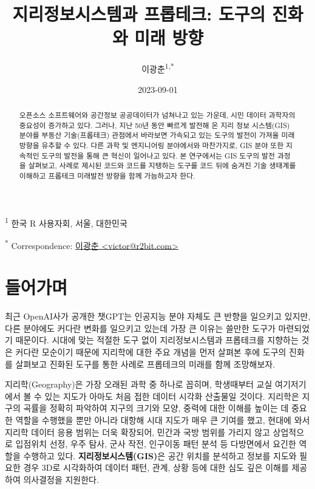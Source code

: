 \documentclass[
  a4paper,showtrims,openright,hidelinks]{oblivoir}
\title{지리정보시스템과 프롭테크: 도구의 진화와 미래 방향}
\author{이광춘\textsuperscript{1,*}}
\date{2023-09-01}
\begin{document}
\maketitle
\begin{abstract}
오픈소스 소프트웨어와 공간정보 공공데이터가 넘쳐나고 있는 가운데, 시민
데이터 과학자의 중요성이 증가하고 있다. 그러나, 지난 50년 동안 빠르게
발전해 온 지리 정보 시스템(GIS) 분야를 부동산 기술(프롭테크) 관점에서
바라보면 가속되고 있는 도구의 발전이 가져올 미래 방향을 유추할 수 있다.
다른 과학 및 엔지니어링 분야에서와 마찬가지로, GIS 분야 또한 지속적인
도구의 발전을 통해 큰 혁신이 일어나고 있다. 본 연구에서는 GIS 도구의
발전 과정을 살펴보고, 사례로 제시된 코드와 코드를 지탱하는 도구를 코드
뒤에 숨겨진 기술 생태계를 이해하고 프롭테크 미래발전 방향을 함께
가늠하고자 한다.
\end{abstract}
\textsuperscript{1} 한국 R 사용자회, 서울, 대한민국

\textsuperscript{*} Correspondence:
\href{mailto:victor@r2bit.com}{이광춘
\textless{}victor@r2bit.com\textgreater{}}

\hypertarget{uxb4e4uxc5b4uxac00uxba70}{%
\section{들어가며}\label{uxb4e4uxc5b4uxac00uxba70}}

최근 OpenAI사가 공개한 챗GPT는 인공지능 분야 자체도 큰 반향을 일으키고
있지만, 다른 분야에도 커다란 변화를 일으키고 있는데 가장 큰 이유는
쓸만한 도구가 마련되었기 때문이다. 시대에 맞는 적절한 도구 없이
지리정보시스템과 프롭테크를 지향하는 것은 커다란 모순이기 때문에
지리학에 대한 주요 개념을 먼저 살펴본 후에 도구의 진화를 살펴보고 진화된
도구를 통한 사례로 프롭테크의 미래를 함께 조망해보자.
\autocite{ChatGPT2023}

지리학(Geography)은 가장 오래된 과학 중 하나로 꼽히며, 학생때부터 교실
여기저기에서 볼 수 있는 지도가 아마도 처음 접한 데이터 시각화 산출물일
것이다. 지리학은 지구의 곡률을 정확히 파악하여 지구의 크기와 모양,
중력에 대한 이해를 높이는 데 중요한 역할을 수행했을 뿐만 아니라 대항해
시대 지도가 매우 큰 기여를 했고, 현대에 와서 지리학 데이터 응용 범위는
더욱 확장되어, 민간과 국방 범위를 가리지 않고 상업적으로 입점위치 선정,
우주 탐사, 군사 작전, 인구이동 패턴 분석 등 다방면에서 요긴한 역할을
수행하고 있다. \textbf{지리정보시스템(GIS)}은 공간 위치를 분석하고
정보를 지도와 필요한 경우 3D로 시각화하여 데이터 패턴, 관계, 상황 등에
대한 심도 깊은 이해를 제공하여 의사결정을 지원한다.
\end{document}
